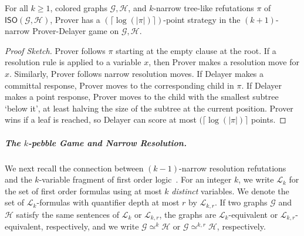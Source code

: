 \documentclass[a4paper,english, thm-restate]{lipics-v2021}
\newcommand{\klogic}[1]{\mathscr{L}_{#1}}
\newcommand{\kmlogic}[2]{\mathscr{L}_{#1, #2}}
\newcommand{\graphG}{\mathcal{G}}
\newcommand{\graphH}{\mathcal{H}}
\newcommand{\ISO}{\mathsf{ISO}(\graphG, \graphH)}
\newcommand{\kequiv}[1]{\simeq^{#1}}
\newcommand{\kequivr}[2]{\simeq^{#1,#2}}
\begin{document}
\begin{lemma} \label{lem: game}
For all $k\ge 1$, colored graphs $\graphG, \graphH$, and $k$-narrow tree-like refutations $\pi$ of $\ISO$, Prover has a $(\lceil \log(|\pi|)  \rceil)$-point strategy in the $(k+1)$-narrow Prover-Delayer game on $\graphG,\graphH$. 
\end{lemma}

\begin{proof}[Proof Sketch]
Prover follows $\pi$ starting at the empty clause at the root.
If a resolution rule is applied to a variable $x$, then Prover makes a resolution move for $x$. Similarly, Prover follows narrow resolution moves.
If Delayer makes a committal response, Prover moves to the corresponding child in $\pi$.
If Delayer makes a point response, Prover moves to the child with the smallest subtree `below it', at least halving the size of the subtree at the current position. Prover wins if a leaf is reached, so Delayer can score at most $(\lceil \log(|\pi|)  \rceil$  points.
\end{proof}

\subparagraph*{The \texorpdfstring{$k$}{k}-pebble Game and Narrow Resolution.}
We next recall the connection between
$(k-1)$-narrow resolution refutations 
and the $k$-variable fragment of first order logic~\cite{DBLP:journals/tocl/ToranW23}.
For an integer $k$, we write $\klogic{k}$ for the set of first order formulas using at most $k$ \emph{distinct} variables.
We denote the set of  $\klogic{k}$-formulas with quantifier depth at most $r$ by $\kmlogic{k}{r}$.
If two graphs $\graphG$ and $\graphH$ satisfy the same sentences of $\klogic{k}$ or $\kmlogic{k}{r}$,
the graphs are $\klogic{k}$-equivalent or $\kmlogic{k}{r}$-equivalent, respectively, and we write $\graphG \kequiv{k} \graphH$ or $\graphG \kequivr{k}{r} \graphH$, respectively.
\end{document}
